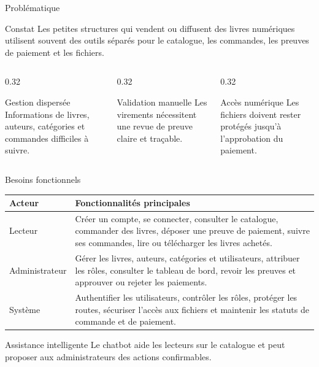 \documentclass[10pt,aspectratio=169]{beamer}
\begin{document}
\begin{frame}{Problématique}
    \begin{block}{Constat}
        Les petites structures qui vendent ou diffusent des livres numériques utilisent souvent des outils séparés pour le catalogue, les commandes, les preuves de paiement et les fichiers.
    \end{block}

    \begin{columns}[T,onlytextwidth]
        \begin{column}{0.32\textwidth}
            \begin{block}{Gestion dispersée}
                Informations de livres, auteurs, catégories et commandes difficiles à suivre.
            \end{block}
        \end{column}
        \begin{column}{0.32\textwidth}
            \begin{block}{Validation manuelle}
                Les virements nécessitent une revue de preuve claire et traçable.
            \end{block}
        \end{column}
        \begin{column}{0.32\textwidth}
            \begin{block}{Accès numérique}
                Les fichiers doivent rester protégés jusqu'à l'approbation du paiement.
            \end{block}
        \end{column}
    \end{columns}
\end{frame}

\begin{frame}{Besoins fonctionnels}
    \small
    \begin{tabular}{|p{}|p{}|}
        \hline
        \textbf{Acteur} & \textbf{Fonctionnalités principales}\\
        \hline
        Lecteur & Créer un compte, se connecter, consulter le catalogue, commander des livres, déposer une preuve de paiement, suivre ses commandes, lire ou télécharger les livres achetés.\\
        \hline
        Administrateur & Gérer les livres, auteurs, catégories et utilisateurs, attribuer les rôles, consulter le tableau de bord, revoir les preuves et approuver ou rejeter les paiements.\\
        \hline
        Système & Authentifier les utilisateurs, contrôler les rôles, protéger les routes, sécuriser l'accès aux fichiers et maintenir les statuts de commande et de paiement.\\
        \hline
    \end{tabular}

    \vspace{0.35cm}
    \begin{block}{Assistance intelligente}
        Le chatbot aide les lecteurs sur le catalogue et peut proposer aux administrateurs des actions confirmables.
    \end{block}
\end{frame}
\end{document}
